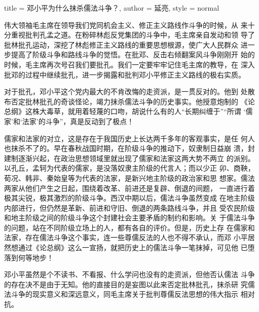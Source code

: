 \begin{hongqiarticle}{
        title  = {邓小平为什么抹杀儒法斗争？},
        author = {延亮},
        style  = normal
    }

    伟大领袖毛主席在领导我们党同机会主义、修正主义路线作斗争的时候，从
    来十分重视批判孔孟之道。在粉碎林彪反党集团的斗争中，毛主席亲自发动和领
    导了批林批孔运动，深挖了林彪修正主义路线的重要思想根源，使广大人民群众
    进一步提高了阶级斗争和路线斗争的觉悟。在批邓、反击右倾翻案风斗争刚刚开
    始的时候，毛主席再次号召我们要批孔。我们一定要牢牢记住毛主席的教导，在
    深入批邓的过程中继续批孔，进一步揭露和批判邓小平修正主义路线的极右实质。

    对于批孔，邓小平这个党内最大的不肯改悔的走资派，是一贯反对的。他到
    处散布否定批林批孔的奇谈怪论，竭力抹杀儒法斗争的历史事实。他授意炮制的
    《论总纲》这株大毒草，就用着轻蔑的口吻，胡说什么有的人“长期纠缠于”“所谓
    ‘儒家’和‘法家’的斗争”，真是反动到了极点！

    儒家和法家的对立，这是存在于我国历史上长达两千多年的客观事实，是任
    何人也抹杀不了的。早在春秋战国时期，在阶级斗争的推动下，奴隶制日益崩
    溃，封建制逐渐兴起，在政治思想领域里就出现了儒家和法家这两大势不两立
    的派别。以孔丘，孟轲为代表的儒家，是没落奴隶主阶级的代言人；而以少正
    卯、商鞅，荀况、韩非、秦始皇等为代表的法家，是新兴地主阶级的政治家和思
    想家。儒法两家从他们产生之日起，围绕着改革、前进还是复辟、倒退的间题，
    一直进行着极其尖锐，极其激烈的阶级斗争。西汉中期以后，儒法斗争虽然变成
    在地主阶级内部进行，但仍然是革新、前进和守旧、倒退的两条路线斗争，并且
    受农民阶级和地主阶级之间的阶级斗争这个封建社会主要矛盾的制约和影响。关
    于儒法斗争的问题，站在不同阶级立场上的人，都有各自的评价。但是，历史上存
    在儒家和法家，存在儒法斗争这个事实，连一些尊儒反法的人也不得不承认，而邓
    小平居然想通过《论总纲》这么一宣扬，就把历史上的儒法斗争一笔抹掉，可见他
    已堕落到何等地步！

    邓小平虽然是个不读书、不看报、什么学问也没有的走资派，但他否认儒法
    斗争的存在决不是由于无知。他的直接目的是妄图以此来否定批林批孔，抹杀研
    究儒法斗争的现实意义和深远意义，同毛主席关于批判尊儒反法思想的伟大指示
    相对抗。


\end{hongqiarticle}
